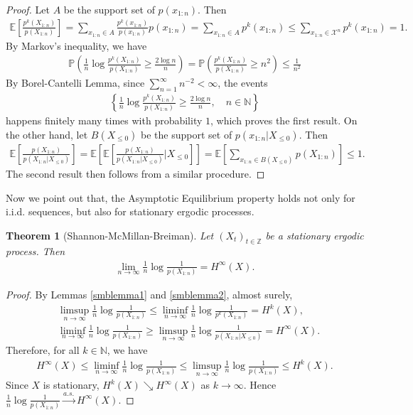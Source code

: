\documentclass{article}
\numberwithin{equation}{section}
\newcommand{\E}{\mathbb{E}}
\newcommand{\bbN}{\mathbb{N}}
\newcommand{\bbP}{\mathbb{P}}
\newcommand{\bbZ}{\mathbb{Z}}
\renewcommand{\cal}{\mathcal}
\theoremstyle{plain}
\newtheorem{theorem}{Theorem}[section]
\theoremstyle{definition}
\begin{document}
\begin{proof}
Let $A$ be the support set of $p(x_{1:n})$. Then
\begin{align*}
	\E\left[\frac{p^k(X_{1:n})}{p(X_{1:n})}\right]=\sum_{x_{1:n}\in A}\frac{p^k(x_{1:n})}{p(x_{1:n})}p(x_{1:n})=\sum_{x_{1:n}\in A}p^k(x_{1:n})\leq\sum_{x_{1:n}\in\cal{X}^n}p^k(x_{1:n})=1.
\end{align*}
By Markov's inequality, we have
\begin{align*}
	\bbP\left(\frac{1}{n}\log\frac{p^k(X_{1:n})}{p(X_{1:n})}\geq\frac{2\log n}{n}\right)=\bbP\left(\frac{p^k(X_{1:n})}{p(X_{1:n})}\geq n^2\right)\leq\frac{1}{n^2}
\end{align*}
By Borel-Cantelli Lemma, since $\sum_{n=1}^\infty n^{-2}<\infty$, the events
\begin{align*}
	\left\{\frac{1}{n}\log\frac{p^k(X_{1:n})}{p(X_{1:n})}\geq\frac{2\log n}{n},\quad n\in\bbN\right\}
\end{align*}
happens finitely many times with probability $1$, which proves the first result. On the other hand, let $B(X_{\leq 0})$ be the support set of $p(x_{1:n}|X_{\leq 0})$. Then
\begin{align*}
	\E\left[\frac{p(X_{1:n})}{p(X_{1:n}|X_{\leq 0})}\right]=\E\left[\E\left[\frac{p(X_{1:n})}{p(X_{1:n}|X_{\leq 0})}\bigg|X_{\leq 0}\right]\right]=\E\left[\sum_{x_{1:n}\in B(X_{\leq 0})}p(X_{1:n})\right]\leq 1.
\end{align*}
The second result then follows from a similar procedure.
\end{proof}

Now we point out that, the Asymptotic Equilibrium property holds not only for i.i.d. sequences, but also for stationary ergodic processes.
\begin{theorem}[Shannon-McMillan-Breiman]\label{smbaep}
Let $(X_t)_{t\in\bbZ}$ be a stationary ergodic process. Then
\begin{align*}
	\lim_{n\to\infty}\frac{1}{n}\log\frac{1}{p(X_{1:n})}=H^\infty(X).
\end{align*}
\end{theorem}
\begin{proof}
By Lemmas \ref{smblemma1} and \ref{smblemma2}, almost surely,
\begin{align*}
	&\limsup_{n\to\infty}\frac{1}{n}\log\frac{1}{p(X_{1:n})}\leq\liminf_{n\to\infty}\frac{1}{n}\log\frac{1}{p^k(X_{1:n})}=H^k(X),\\
	&\liminf_{n\to\infty}\frac{1}{n}\log\frac{1}{p(X_{1:n})}\geq \limsup_{n\to\infty}\frac{1}{n}\log\frac{1}{p(X_{1:n}|X_{\leq 0})}=H^\infty(X).
\end{align*}
Therefore, for all $k\in\bbN$, we have
\begin{align*}
	H^\infty(X)\leq\liminf_{n\to\infty}\frac{1}{n}\log\frac{1}{p(X_{1:n})}\leq\limsup_{n\to\infty}\frac{1}{n}\log\frac{1}{p(X_{1:n})}\leq H^k(X).
\end{align*}
Since $X$ is stationary, $H^k(X)\searrow H^\infty(X)$ as $k\to\infty$. Hence $\frac{1}{n}\log\frac{1}{p(X_{1:n})}\overset{a.s.}{\to}H^\infty(X)$.
\end{proof}
\end{document}
